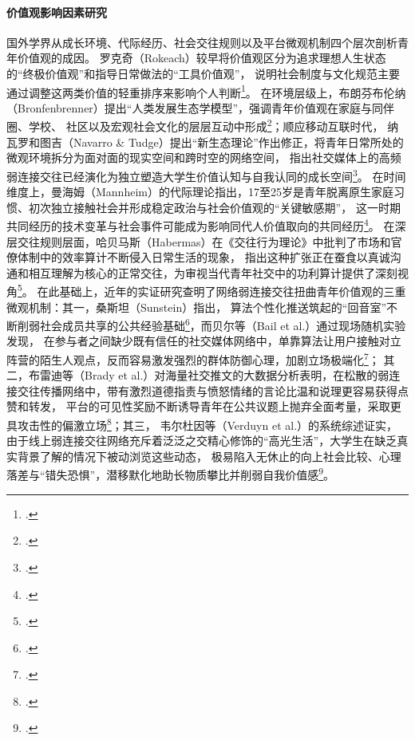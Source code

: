 \paragraph{价值观影响因素研究}
国外学界从成长环境、代际经历、社会交往规则以及平台微观机制四个层次剖析青年价值观的成因。
罗克奇（Rokeach）较早将价值观区分为追求理想人生状态的“终极价值观”和指导日常做法的“工具价值观”，
说明社会制度与文化规范主要通过调整这两类价值的轻重排序来影响个人判断\footcite{Rokeach1973}。
在环境层级上，布朗芬布伦纳（Bronfenbrenner）提出“人类发展生态学模型”，强调青年价值观在家庭与同伴圈、学校、
社区以及宏观社会文化的层层互动中形成\footcite{Bronfenbrenner1979}；顺应移动互联时代，
纳瓦罗和图吉（Navarro \& Tudge）提出“新生态理论”作出修正，将青年日常所处的微观环境拆分为面对面的现实空间和跨时空的网络空间，
指出社交媒体上的高频弱连接交往已经演化为独立塑造大学生价值认知与自我认同的成长空间\footcite{Navarro2023}。
在时间维度上，曼海姆（Mannheim）的代际理论指出，17至25岁是青年脱离原生家庭习惯、初次独立接触社会并形成稳定政治与社会价值观的“关键敏感期”，
这一时期共同经历的技术变革与社会事件可能成为影响同代人价值取向的共同经历\footcite{Mannheim1952}。
在深层交往规则层面，哈贝马斯（Habermas）在《交往行为理论》中批判了市场和官僚体制中的效率算计不断侵入日常生活的现象，
指出这种扩张正在蚕食以真诚沟通和相互理解为核心的正常交往，为审视当代青年社交中的功利算计提供了深刻视角\footcite{Habermas2004}。
在此基础上，近年的实证研究查明了网络弱连接交往扭曲青年价值观的三重微观机制：其一，桑斯坦（Sunstein）指出，
算法个性化推送筑起的“回音室”不断削弱社会成员共享的公共经验基础\footcite{Sunstein2017}，而贝尔等（Bail et al.）通过现场随机实验发现，
在参与者之间缺少既有信任的社交媒体网络中，单靠算法让用户接触对立阵营的陌生人观点，反而容易激发强烈的群体防御心理，加剧立场极端化\footcite{Bail2018}；
其二，布雷迪等（Brady et al.）对海量社交推文的大数据分析表明，在松散的弱连接交往传播网络中，带有激烈道德指责与愤怒情绪的言论比温和说理更容易获得点赞和转发，
平台的可见性奖励不断诱导青年在公共议题上抛弃全面考量，采取更具攻击性的偏激立场\footcite{Brady2021}；其三，
韦尔杜因等（Verduyn et al.）的系统综述证实，由于线上弱连接交往网络充斥着泛泛之交精心修饰的“高光生活”，大学生在缺乏真实背景了解的情况下被动浏览这些动态，
极易陷入无休止的向上社会比较、心理落差与“错失恐惧”，潜移默化地助长物质攀比并削弱自我价值感\footcite{Verduyn2020}。

